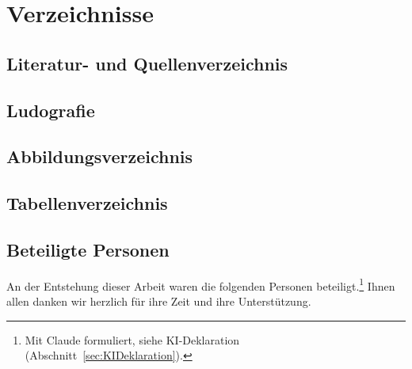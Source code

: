 \documentclass[../Main.tex]{subfiles}
\begin{document}
\section{Verzeichnisse}

\subsection{Literatur- und Quellenverzeichnis}

\printbibliography[heading=none, nottype=software]

\subsection{Ludografie}

\printbibliography[heading=none, type=software]

\subsection{Abbildungsverzeichnis}

\listoffigures

\subsection{Tabellenverzeichnis}

\listoftables

\subsection{Beteiligte Personen} \label{sec:Beteiligte}

An der Entstehung dieser Arbeit waren die folgenden Personen beteiligt.\footnote{Mit Claude formuliert, siehe KI-Deklaration (Abschnitt~\ref{sec:KIDeklaration}).} Ihnen allen danken wir herzlich für ihre Zeit und ihre Unterstützung.
\end{document}
